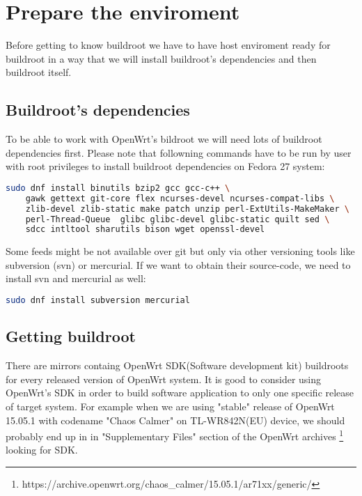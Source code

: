 \section{Prepare the enviroment}

Before getting to know buildroot we have to have host enviroment ready for buildroot in a way that we will install buildroot's dependencies and then buildroot itself.

\subsection{Buildroot's dependencies}

To be able to work with OpenWrt's bildroot we will need lots of buildroot dependencies first.
Please note that followning commands have to be run by user with root privileges to install buildroot dependencies on Fedora 27 system:

\begin{lstlisting}[language=bash,basicstyle=\ttfamily\footnotesize,label=fedora-dep-install,caption=Buildroot dependencies installation on Fedora 27]
    sudo dnf install binutils bzip2 gcc gcc-c++ \
    gawk gettext git-core flex ncurses-devel ncurses-compat-libs \
    zlib-devel zlib-static make patch unzip perl-ExtUtils-MakeMaker \
    perl-Thread-Queue  glibc glibc-devel glibc-static quilt sed \
    sdcc intltool sharutils bison wget openssl-devel
\end{lstlisting}
Some feeds might be not available over git but only via other versioning tools like subversion (svn) or mercurial.
If we want to obtain their source-code, we need to install svn and mercurial as well:
\begin{lstlisting}[language=bash,basicstyle=\ttfamily\footnotesize,label=fedora-ver-install,caption=Other versioning tools installation on Fedora 27]
    sudo dnf install subversion mercurial
\end{lstlisting}

\subsection{Getting buildroot}

There are mirrors containg OpenWrt SDK(Software development kit) buildroots for every released version of OpenWrt system.
It is good to consider using OpenWrt's SDK in order to build software application to only one specific release of target system.
For example when we are using "stable" release of OpenWrt 15.05.1 with codename "Chaos Calmer" on TL-WR842N(EU) device, we should probably end up in in "Supplementary Files" section of the OpenWrt archives
\footnote{https://archive.openwrt.org/chaos\_calmer/15.05.1/ar71xx/generic/} looking for SDK.

